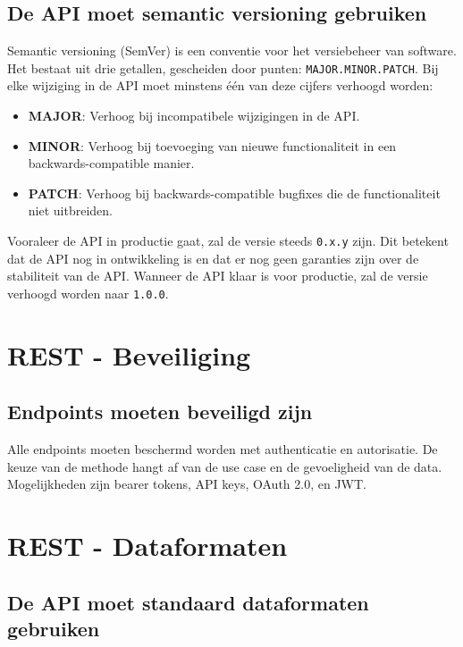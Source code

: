 \subsection{De API moet semantic versioning gebruiken}
\label{subsection:semantic_versioning}

Semantic versioning (SemVer) is een conventie voor het versiebeheer van software. Het bestaat uit drie getallen, gescheiden door punten: \texttt{MAJOR.MINOR.PATCH}. Bij elke wijziging in de API moet minstens één van deze cijfers verhoogd worden:

\begin{itemize}
    \item \textbf{MAJOR}: Verhoog bij incompatibele wijzigingen in de API.
    \item \textbf{MINOR}: Verhoog bij toevoeging van nieuwe functionaliteit in een backwards-compatible manier.
    \item \textbf{PATCH}: Verhoog bij backwards-compatible bugfixes die de functionaliteit niet uitbreiden.
\end{itemize}

Vooraleer de API in productie gaat, zal de versie steeds \texttt{0.x.y} zijn. Dit betekent dat de API nog in ontwikkeling is en dat er nog geen garanties zijn over de stabiliteit van de API. Wanneer de API klaar is voor productie, zal de versie verhoogd worden naar \texttt{1.0.0}.

\section{REST - Beveiliging}

\subsection{Endpoints moeten beveiligd zijn}
\label{section:beveiligde_endpoints}

Alle endpoints moeten beschermd worden met authenticatie en autorisatie. De keuze van de methode hangt af van de use case en de gevoeligheid van de data. Mogelijkheden zijn bearer tokens, API keys, OAuth 2.0, en JWT.

\section{REST - Dataformaten}

\subsection{De API moet standaard dataformaten gebruiken}
\label{section:standaard_dataformaten}

